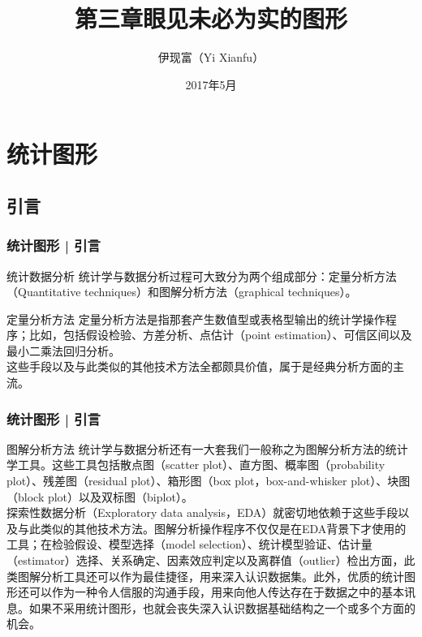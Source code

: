 



\title[统计图]{第三章\quad 眼见未必为实的图形}
\author[Yixf]{伊现富（Yi Xianfu）}
\date{2017年5月}




\section{统计图形}
\subsection{引言}
\begin{frame}
  \frametitle{统计图形 | 引言}
  \begin{block}{统计数据分析}
    统计学与数据分析过程可大致分为两个组成部分：定量分析方法（Quantitative techniques）和图解分析方法（graphical techniques）。
  \end{block}
  \pause
  \begin{block}{定量分析方法}
    定量分析方法是指那套产生数值型或表格型输出的统计学操作程序；比如，包括假设检验、方差分析、点估计（point estimation）、可信区间以及最小二乘法回归分析。\\
    \vspace{0.5em}
    这些手段以及与此类似的其他技术方法全都颇具价值，属于是经典分析方面的主流。
  \end{block}
\end{frame}

\begin{frame}
  \frametitle{统计图形 | 引言}
  \begin{block}{图解分析方法}
统计学与数据分析还有一大套我们一般称之为图解分析方法的统计学工具。这些工具包括散点图（scatter plot）、直方图、概率图（probability plot）、残差图（residual plot）、箱形图（box plot，box-and-whisker plot）、块图（block plot）以及双标图（biplot）。\\
\vspace{0.5em}
探索性数据分析（Exploratory data analysis，EDA）就密切地依赖于这些手段以及与此类似的其他技术方法。图解分析操作程序不仅仅是在EDA背景下才使用的工具；在检验假设、模型选择（model selection）、统计模型验证、估计量（estimator）选择、关系确定、因素效应判定以及离群值（outlier）检出方面，此类图解分析工具还可以作为最佳捷径，用来深入认识数据集。此外，优质的统计图形还可以作为一种令人信服的沟通手段，用来向他人传达存在于数据之中的基本讯息。如果不采用统计图形，也就会丧失深入认识数据基础结构之一个或多个方面的机会。
  \end{block}
\end{frame}

